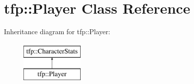 \hypertarget{classtfp_1_1_player}{}\section{tfp\+:\+:Player Class Reference}
\label{classtfp_1_1_player}
Inheritance diagram for tfp\+:\+:Player\+:\begin{figure}[H]
\begin{center}
\leavevmode
\includegraphics[height=2.000000cm]{classtfp_1_1_player}
\end{center}
\end{figure}
